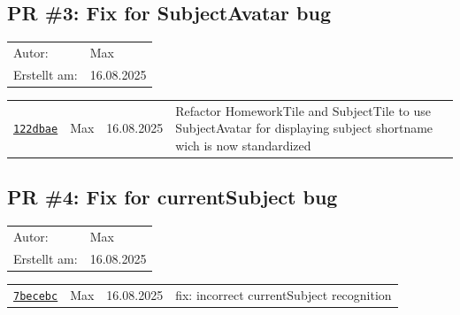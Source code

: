 \documentclass{article}%
\begin{document}
\subsection{PR \#3: Fix for SubjectAvatar bug}%
\label{pr:3}%
\begin{tabular}{l l}%
Autor:&Max\\%
Erstellt am: &16.08.2025\\%
\end{tabular}%
\begin{longtable}{l l l p{12cm}}%
\href{https://github.com/scriptor1000/homeworks/pull/3/commits/122dbae2d3eb8508bf72b7accb79ed152a2971b7}{\underline{\texttt{122dbae}}}&Max&16.08.2025&Refactor HomeworkTile and SubjectTile to use SubjectAvatar for displaying subject shortname wich is now standardized\\%
\end{longtable}

%
\subsection{PR \#4: Fix for currentSubject bug}%
\label{pr:4}%
\begin{tabular}{l l}%
Autor:&Max\\%
Erstellt am: &16.08.2025\\%
\end{tabular}%
\begin{longtable}{l l l p{12cm}}%
\href{https://github.com/scriptor1000/homeworks/pull/4/commits/7becebc629549f22cc7057450e3255d2068ef269}{\underline{\texttt{7becebc}}}&Max&16.08.2025&fix: incorrect currentSubject recognition\\%
\end{longtable}

%
\end{document}
